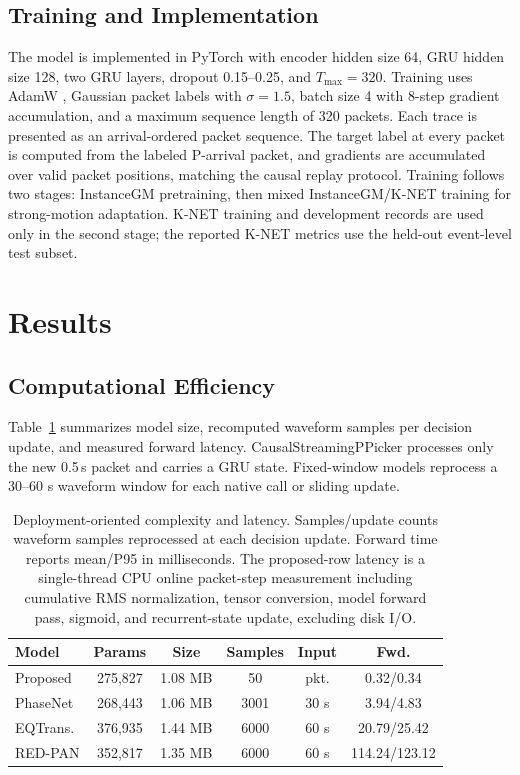 \documentclass[journal]{IEEEtran}
\newcommand{\modelv}{CausalStreamingPPicker\xspace}
\newcommand{\chunk}{0.5\,s\xspace}
\newcommand{\tgrsdensetablesetup}{\footnotesize\setlength{\tabcolsep}{2.0pt}\renewcommand{\arraystretch}{1.06}}
\begin{document}
\subsection{Training and Implementation}
The model is implemented in PyTorch with encoder hidden size 64, GRU hidden size 128, two GRU layers, dropout 0.15--0.25, and $T_{\max}=320$. Training uses AdamW \cite{loshchilov2019adamw}, Gaussian packet labels with $\sigma=1.5$, batch size 4 with 8-step gradient accumulation, and a maximum sequence length of 320 packets. Each trace is presented as an arrival-ordered packet sequence. The target label at every packet is computed from the labeled P-arrival packet, and gradients are accumulated over valid packet positions, matching the causal replay protocol. Training follows two stages: InstanceGM pretraining, then mixed InstanceGM/K-NET training for strong-motion adaptation. K-NET training and development records are used only in the second stage; the reported K-NET metrics use the held-out event-level test subset.

\section{Results}

\subsection{Computational Efficiency}
Table~\ref{tab:efficiency} summarizes model size, recomputed waveform samples per decision update, and measured forward latency. \modelv{} processes only the new \chunk packet and carries a GRU state. Fixed-window models reprocess a 30--60 s waveform window for each native call or sliding update.

\begin{table}[!t]
\centering
\caption{Deployment-oriented complexity and latency. Samples/update counts waveform samples reprocessed at each decision update. Forward time reports mean/P95 in milliseconds. The proposed-row latency is a single-thread CPU online packet-step measurement including cumulative RMS normalization, tensor conversion, model forward pass, sigmoid, and recurrent-state update, excluding disk I/O.}
\label{tab:efficiency}
{\tgrsdensetablesetup
\begin{tabular}{@{}lccccc@{}}
\toprule
Model & Params & Size & Samples & Input & Fwd.\\
\midrule
Proposed & 275,827 & 1.08 MB & 50 & pkt. & 0.32/0.34\\
PhaseNet & 268,443 & 1.06 MB & 3001 & 30 s & 3.94/4.83\\
EQTrans. & 376,935 & 1.44 MB & 6000 & 60 s & 20.79/25.42\\
RED-PAN & 352,817 & 1.35 MB & 6000 & 60 s & 114.24/123.12\\
\bottomrule
\end{tabular}}
\end{table}
\end{document}
